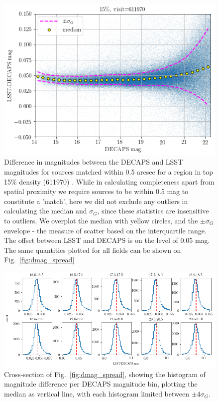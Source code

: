 \documentclass[DM,lsstdraft,toc,usenatbib]{lsstdoc}
\begin{document}
\begin{figure}
\begin{centering}
\includegraphics[width=0.6\columnwidth]{figs/15_decaps_lsst_dmag_density_15.png}
\caption{Difference in magnitudes between the DECAPS and LSST magnitudes for sources matched within 0.5 arcsec for a region in top 15\% density (611970) . While in calculating completeness apart from spatial proximity we require sources to be within 0.5 mag to constitute a 'match', here we did not exclude any outliers in calculating the median and $\sigma_{G}$, since these statistics are insensitive to outliers.  We overplot the median with yellow circles, and the $\pm \sigma_{G}$ envelope - the measure of scatter based on the interquartile range. The offset between LSST and DECAPS is on the level of 0.05 mag. The same quantities plotted for all fields can be shown on Fig.~\ref{fig:dmag_spread} }
\label{fig:dmag_scatter}
\end{centering}
\end{figure} 

\begin{figure}
\includegraphics[width=1.0\columnwidth]{figs/16_rms_decaps_lsst_611970hist_panel.png}
\caption{Cross-section of Fig.~\ref{fig:dmag_spread}, showing the histogram of magnitude difference per DECAPS magnitude bin, plotting the median as vertical line, with each histogram limited between $\pm 4 \sigma_{G}$. }
\label{fig:dmag_hist}
\end{figure} 
\end{document}
